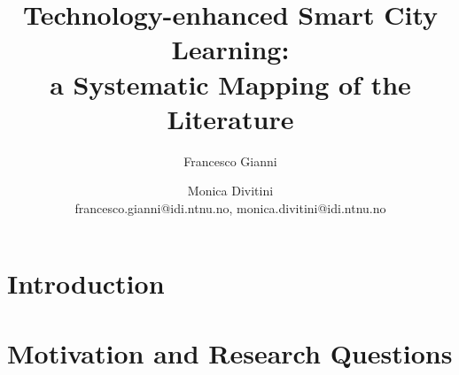 \documentclass[runningheads,a4paper]{llncs}
\begin{document}


\title{Technology-enhanced Smart City Learning:\\ a Systematic Mapping of the Literature}

\author{Francesco Gianni \and Monica Divitini\\
francesco.gianni@idi.ntnu.no, monica.divitini@idi.ntnu.no}

%
\iffalse
\author{Firstname Lastname\inst{1} \and Firstname Lastname\inst{2} }

\institute{
Insitute 1\\
\email{...}\and
Insitute 2\\
\email{...}
}
\fi
			
\maketitle

\begin{abstract}
  
\end{abstract}


\section{Introduction}\label{sec:intro}


\section{Motivation and Research Questions}

\end{document}
